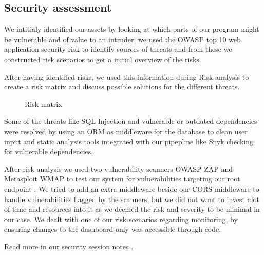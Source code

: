 \subsection{Security assessment}
We intitialy identified our assets by looking at which parts of our program might be vulnerable and of value to an intruder, 
we used the OWASP top 10 web application security risk \cite{owasp-top-10} to identify sources of threats and from these we constructed risk scenarios to get a initial overview of the risks.

After having identified risks, we used this information during Risk analysis to create a risk matrix and discuss possible solutions for the different threats. 

\begin{wrapfigure}{R}{0.40\paperwidth}
    \caption{Risk matrix}
    \label{fig:Risk-matrix}
\end{wrapfigure}

Some of the threats like SQL Injection and vulnerable or outdated dependencies were resolved by using an ORM \cite{gorm} as middleware for the database to clean user input and static analysis tools integrated with our pipepline like Snyk \cite{snyk} checking for vulnerable dependencies.

After risk analysis we used two vulnerability scanners OWASP ZAP \cite{owasp-zap} and Metasploit \cite{metasploit} WMAP \cite{metasploit-wmap} to test our system for vulnerabilities targeting our root endpoint \cite{minitwit-root-endpoint}.
We tried to add an extra middleware beside our CORS middleware to handle vulnerabilities flagged by the scanners, but we did not want to invest alot of time and resources into it as we deemed the risk and severity to be minimal in our case.
We dealt with one of our risk scenarios regarding monitoring, by ensuring changes to the dashboard only was accessible through code.

Read more in our security session notes \cite{repo:security-session-notes}.

